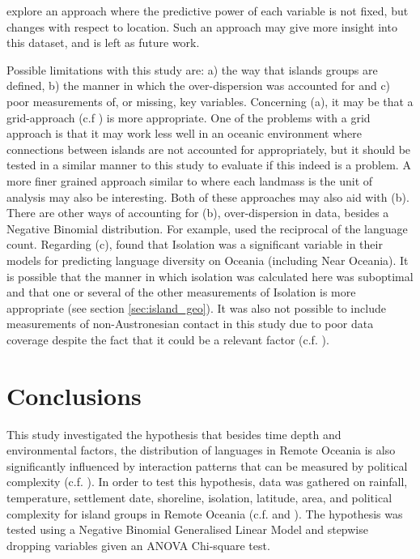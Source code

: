 \documentclass[a4paper,10pt]{article} %
\begin{document}

\citet{Pacheco_Coelho_2019} explore an approach where the predictive power of each variable is not fixed, but changes with respect to location. Such an approach may give more insight into this dataset, and is left as future work.

Possible limitations with this study are: a) the way that islands groups are defined, b) the manner in which the over-dispersion was accounted for and c) poor measurements of, or missing, key variables. Concerning (a), it may be that a grid-approach (c.f \citet{hua2019ecological}) is more appropriate. One of the problems with a grid approach is that it may work less well in an oceanic environment where connections between islands are not accounted for appropriately, but it should be tested in a similar manner to this study to evaluate if this indeed is a problem. A more finer grained approach similar to  \citet{gavin2012island} where each landmass is the unit of analysis may also be interesting. Both of these approaches may also aid with (b). There are other ways of accounting for (b), over-dispersion in data, besides a Negative Binomial distribution. For example, \citet[4-5]{gavin2012island} used the reciprocal of the language count. Regarding (c), \citet[4-5]{gavin2012island} found that Isolation was a significant variable in their models for predicting language diversity on Oceania (including Near Oceania). It is possible that the manner in which isolation was calculated here was suboptimal and that one or several of the other measurements of Isolation is more appropriate (see section \ref{sec:island_geo}). It was also not possible to include measurements of non-Austronesian contact in this study due to poor data coverage despite the fact that it could be a relevant factor (c.f. \citet{lipson_harvad_ancient_dna_vanuatu_2018, posth_jena_ancient_dna_vanuatu_2018}). 
 

\FloatBarrier
\section{Conclusions}
This study investigated the hypothesis that besides time depth and environmental factors, the distribution of languages in Remote Oceania is also significantly influenced by interaction patterns that can be measured by political complexity (c.f. \citet{pawley81, pawley2007}). In order to test this hypothesis, data was gathered on rainfall, temperature, settlement date, shoreline, isolation, latitude, area, and political complexity for island groups in Remote Oceania (c.f. \citet{curriemace2009, gavin2012island, hua2019ecological} and \citet{Pacheco_Coelho_2019}). The hypothesis was tested using a Negative Binomial Generalised Linear Model and stepwise dropping variables given an ANOVA Chi-square test.
\end{document}
